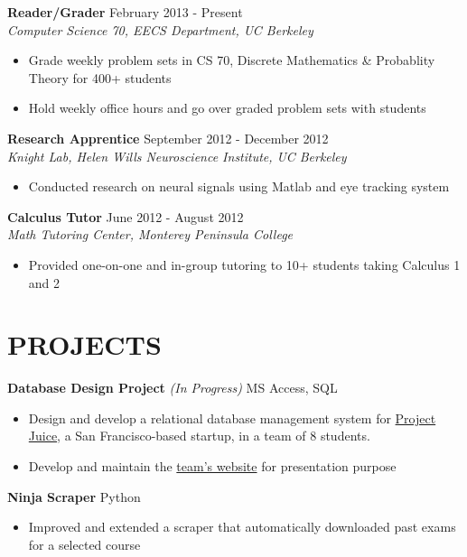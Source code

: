 \documentclass[margin]{res}
\begin{document}
\begin{resume}
\textbf{Reader/Grader} \hfill February 2013 - Present\\
\textit{Computer Science 70, EECS Department, UC Berkeley} \smallskip
\begin{itemize}[leftmargin=10pt]
\item Grade weekly problem sets in CS 70, Discrete Mathematics \& Probablity Theory for 400+ students
\item Hold weekly office hours and go over graded problem sets with students
\end{itemize}

\textbf{Research Apprentice} \hfill September 2012 - December 2012 \\
\textit{Knight Lab, Helen Wills Neuroscience Institute, UC Berkeley} \smallskip
\begin{itemize}[leftmargin=10pt]
\item Conducted research on neural signals using Matlab and eye tracking system
\end{itemize}

\textbf{Calculus Tutor} \hfill June 2012 - August 2012 \\
\textit{Math Tutoring Center, Monterey Peninsula College} \smallskip
\begin{itemize}[leftmargin=10pt]
\item Provided one-on-one and in-group tutoring to 10+ students taking Calculus 1 and 2
\end{itemize}

\section{PROJECTS} 
\textbf{Database Design Project} \textit{(In Progress)} \hfill MS Access, SQL
\begin{itemize}[leftmargin=10pt]
\itemsep -2pt %
\item Design and develop a relational database management system for \href{http://www.projectjuice.com/}{Project Juice}, a San Francisco-based startup, in a team of 8 students.
\item Develop and maintain the \href{http://www.ocf.berkeley.edu/~kqdtran/ieor115/proposal}{team's website} for presentation purpose
\end{itemize}

\textbf{Ninja Scraper} \hfill Python
\begin{itemize}[leftmargin=10pt]
\itemsep -2pt %
\item Improved and extended a scraper that automatically downloaded past exams for a selected course
\end{itemize}


\end{resume}
\end{document}
